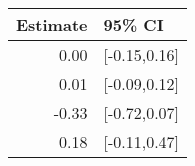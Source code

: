 \begin{tabular}{rl}
  \hline
Estimate & 95\% CI \\ 
  \hline
0.00 & [-0.15,0.16] \\ 
  0.01 & [-0.09,0.12] \\ 
  -0.33 & [-0.72,0.07] \\ 
  0.18 & [-0.11,0.47] \\ 
   \hline
\end{tabular}

